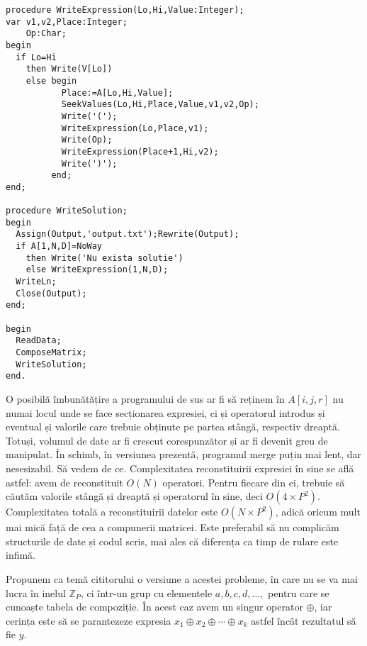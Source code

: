 \begin{verbatim}
procedure WriteExpression(Lo,Hi,Value:Integer);
var v1,v2,Place:Integer;
    Op:Char;
begin
  if Lo=Hi
    then Write(V[Lo])
    else begin
           Place:=A[Lo,Hi,Value];
           SeekValues(Lo,Hi,Place,Value,v1,v2,Op);
           Write('(');
           WriteExpression(Lo,Place,v1);
           Write(Op);
           WriteExpression(Place+1,Hi,v2);
           Write(')');
         end;
end;

procedure WriteSolution;
begin
  Assign(Output,'output.txt');Rewrite(Output);
  if A[1,N,D]=NoWay
    then Write('Nu exista solutie')
    else WriteExpression(1,N,D);
  WriteLn;
  Close(Output);
end;

begin
  ReadData;
  ComposeMatrix;
  WriteSolution;
end.
\end{verbatim}

O posibilă îmbunătățire a programului de sus ar fi să reținem în $A[i,j,r]$ nu
numai locul unde se face secționarea expresiei, ci și operatorul introdus și
eventual și valorile care trebuie obținute pe partea stângă, respectiv
dreaptă. Totuși, volumul de date ar fi crescut corespunzător și ar fi devenit
greu de manipulat. În schimb, în versiunea prezentă, programul merge puțin mai
lent, dar nesesizabil. Să vedem de ce. Complexitatea reconstituirii expresiei
în sine se află astfel: avem de reconstituit $O(N)$ operatori. Pentru fiecare
din ei, trebuie să căutăm valorile stângă și dreaptă și operatorul în sine,
deci $O(4 \times P^2)$. Complexitatea totală a reconstituirii datelor este
$O(N \times P^2)$, adică oricum mult mai mică față de cea a compunerii
matricei. Este preferabil să nu complicăm structurile de date și codul scris,
mai ales că diferența ca timp de rulare este infimă.

Propunem ca temă cititorului o versiune a acestei probleme, în care nu se va
mai lucra în inelul $\mathbb{Z}_P$, ci într-un grup cu elementele $a, b, c, d,
\dots,$ pentru care se cunoaște tabela de compoziție. În acest caz avem un
singur operator $\oplus$, iar cerința este să se parantezeze expresia $x_1
\oplus x_2 \oplus \cdots \oplus x_k$ astfel încât rezultatul să fie $y$.
